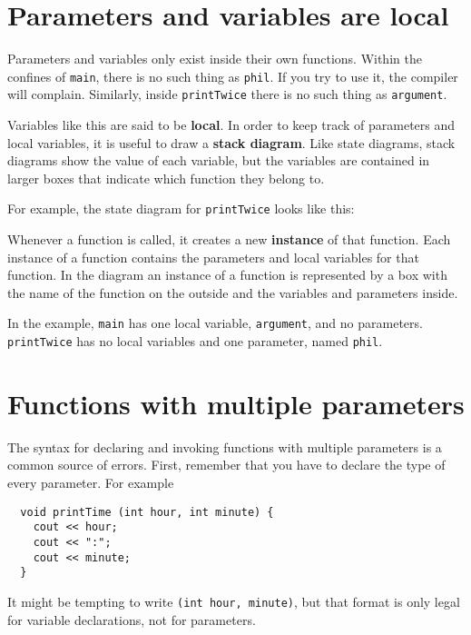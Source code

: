 \section {Parameters and variables are local}

Parameters and
variables only exist inside their own functions.  Within the
confines of {\tt main}, there is no such thing as {\tt phil}.
If you try to use it, the compiler will complain.  Similarly,
inside {\tt printTwice} there is no such thing as {\tt argument}.

Variables like this are said to be {\bf local}.  In order to
keep track of parameters and local variables, it is useful to
draw a {\bf stack diagram}.  Like state diagrams, stack diagrams
show the value of each variable, but the variables are contained
in larger boxes that indicate which function they belong to.

For example, the state diagram for {\tt printTwice} looks 
like this:

\vspace{0.1in}
\centerline{}
\vspace{0.1in}
%
Whenever a function is called, it creates a new {\bf instance}
of that function.  Each instance of a function contains the
parameters and local variables for that function.  In the
diagram an instance of a function is represented by a box
with the name of the function on the outside and the variables
and parameters inside.

In the example, {\tt main} has one local variable, {\tt argument}, and
no parameters.  {\tt printTwice} has no local variables and one
parameter, named {\tt phil}.

\section {Functions with multiple parameters}

The syntax for declaring and invoking functions with multiple
parameters is a common source of errors.  First, remember
that you have to declare the type of every parameter.  For
example

\begin{lstlisting}
  void printTime (int hour, int minute) {
    cout << hour;
    cout << ":";
    cout << minute;
  }
\end{lstlisting}
%
It might be tempting to write {\tt (int hour, minute)}, but
that format is only legal for variable declarations, not
for parameters.

